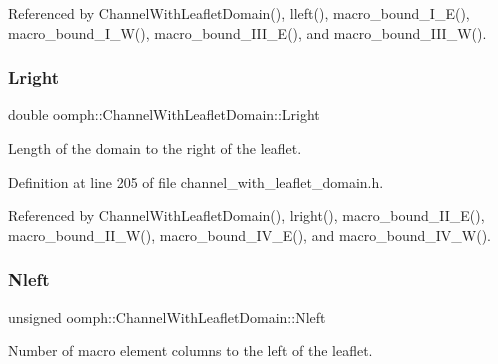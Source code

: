 Referenced by Channel\+With\+Leaflet\+Domain(), lleft(), macro\+\_\+bound\+\_\+\+I\+\_\+\+E(), macro\+\_\+bound\+\_\+\+I\+\_\+\+W(), macro\+\_\+bound\+\_\+\+I\+I\+I\+\_\+\+E(), and macro\+\_\+bound\+\_\+\+I\+I\+I\+\_\+\+W().

\mbox{\label{classoomph_1_1ChannelWithLeafletDomain_a6c1a799bbedc5f0ff08f38088eaedc68}} 
\subsubsection{\texorpdfstring{Lright}{Lright}}
{\footnotesize\ttfamily double oomph\+::\+Channel\+With\+Leaflet\+Domain\+::\+Lright\hspace{0.3cm}{\ttfamily [protected]}}



Length of the domain to the right of the leaflet. 



Definition at line 205 of file channel\+\_\+with\+\_\+leaflet\+\_\+domain.\+h.



Referenced by Channel\+With\+Leaflet\+Domain(), lright(), macro\+\_\+bound\+\_\+\+I\+I\+\_\+\+E(), macro\+\_\+bound\+\_\+\+I\+I\+\_\+\+W(), macro\+\_\+bound\+\_\+\+I\+V\+\_\+\+E(), and macro\+\_\+bound\+\_\+\+I\+V\+\_\+\+W().

\mbox{\label{classoomph_1_1ChannelWithLeafletDomain_ad0abd8837f9f0924b801d2fb78c69532}} 
\subsubsection{\texorpdfstring{Nleft}{Nleft}}
{\footnotesize\ttfamily unsigned oomph\+::\+Channel\+With\+Leaflet\+Domain\+::\+Nleft\hspace{0.3cm}{\ttfamily [protected]}}



Number of macro element columns to the left of the leaflet. 



